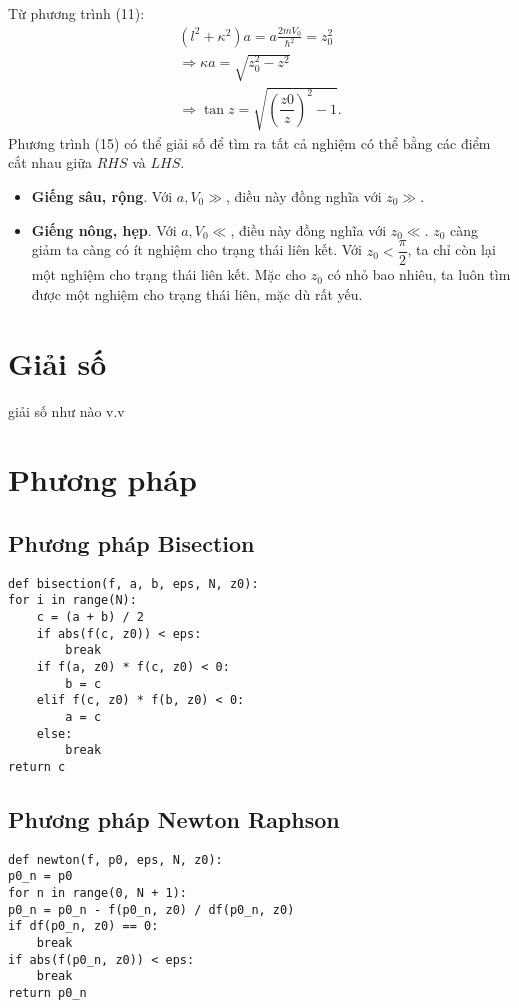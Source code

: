 \documentclass{article}
\begin{document}
	Từ phương trình (11):
	\begin{align}
		(l^2 + \kappa^2)a = a\frac{2mV_0}{\hbar^2} = z_0^2 \nonumber\\
		\Rightarrow \kappa a = \sqrt{z_0^2 - z^2} \\
		\Rightarrow \tan z = \sqrt{\left( \dfrac{z0}{z} \right)^2 - 1}.
	\end{align}
	Phương trình (15) có thể giải số để tìm ra tất cả nghiệm có thể bằng các điểm cắt nhau giữa $RHS$ và $LHS$.
	\begin{itemize}
		\item \textbf{Giếng sâu, rộng}. Với $a,V_0 \gg$, điều này đồng nghĩa với $z_0 \gg$. 
		\item \textbf{Giếng nông, hẹp}. Với $a,V_0 \ll$, điều này đồng nghĩa với $z_0 \ll$. $z_0$ càng giảm ta càng có ít nghiệm cho trạng thái liên kết. Với $z_0 < \dfrac{\pi}{2}$, ta chỉ còn lại một nghiệm cho trạng thái liên kết. Mặc cho $z_0$ có nhỏ bao nhiêu, ta luôn tìm được một nghiệm cho trạng thái liên, mặc dù rất yếu.
	\end{itemize}
	
	
	
	
	
	
	
	
	
	
	
	
	
	\section{Giải số}
	giải số như nào v.v
	
	\newpage
	\section{Phương pháp}
	\subsection{Phương pháp Bisection}
	\begin{verbatim}
def bisection(f, a, b, eps, N, z0):
for i in range(N):
	c = (a + b) / 2
	if abs(f(c, z0)) < eps:
		break
	if f(a, z0) * f(c, z0) < 0:
		b = c
	elif f(c, z0) * f(b, z0) < 0:
		a = c
	else:
		break
return c
	\end{verbatim}
	\subsection{Phương pháp Newton Raphson}
	\begin{verbatim}
def newton(f, p0, eps, N, z0):
p0_n = p0
for n in range(0, N + 1):
p0_n = p0_n - f(p0_n, z0) / df(p0_n, z0)
if df(p0_n, z0) == 0:
	break
if abs(f(p0_n, z0)) < eps:
	break
return p0_n
	\end{verbatim}
\end{document}
